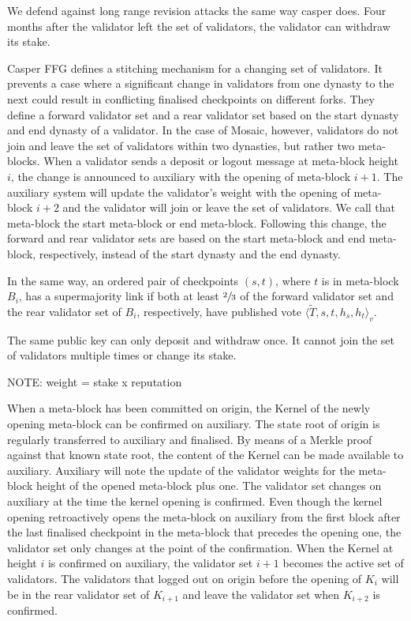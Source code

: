 \documentclass[12pt,a4paper]{article}
\begin{document}
We defend against long range revision attacks the same way casper does.
Four months after the validator left the set of validators, the validator can withdraw its stake.

Casper FFG\cite{casperffg} defines a stitching mechanism for a changing set of validators.
It prevents a case where a significant change in validators from one dynasty to the next could result in conflicting finalised checkpoints on different forks.
They define a forward validator set and a rear validator set based on the start dynasty and end dynasty of a validator.
In the case of Mosaic, however, validators do not join and leave the set of validators within two dynasties, but rather two meta-blocks.
When a validator sends a deposit or logout message at meta-block height $i$, the change is announced to auxiliary with the opening of meta-block $i+1$.
The auxiliary system will update the validator's weight with the opening of meta-block $i+2$ and the validator will join or leave the set of validators. We call that meta-block the start meta-block or end meta-block.
Following this change, the forward and rear validator sets are based on the start meta-block and end meta-block, respectively, instead of the start dynasty and the end dynasty.

 In the same way, an ordered pair of checkpoints $(s, t)$, where $t$ is in meta-block $B_i$, has a supermajority link if both at least $\sfrac{2}{3}$ of the forward validator set and the rear validator set of $B_i$, respectively, have published vote $\langle \tilde{T}, s, t, h_{s}, h_{t}\rangle_v$.

The same public key can only deposit and withdraw once.
It cannot join the set of validators multiple times or change its stake.

NOTE: weight = stake x reputation

When a meta-block has been committed on origin, the Kernel of the newly opening meta-block can be confirmed on auxiliary.
The state root of origin is regularly transferred to auxiliary and finalised.
By means of a Merkle proof against that known state root, the content of the Kernel can be made available to auxiliary.
Auxiliary will note the update of the validator weights for the meta-block height of the opened meta-block plus one.
The validator set changes on auxiliary at the time the kernel opening is confirmed.
Even though the kernel opening retroactively opens the meta-block on auxiliary from the first block after the last finalised checkpoint in the meta-block that precedes the opening one, the validator set only changes at the point of the confirmation.
When the Kernel at height $i$ is confirmed on auxiliary, the validator set $i+1$ becomes the active set of validators.
The validators that logged out on origin before the opening of $K_i$ will be in the rear validator set of $K_{i+1}$ and leave the validator set when $K_{i+2}$ is confirmed.
\end{document}
